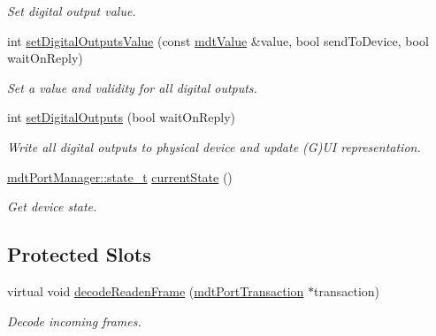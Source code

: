 \begin{DoxyCompactItemize}
\begin{DoxyCompactList}\small\item\em Set digital output value. \end{DoxyCompactList}\item 
int \hyperlink{classmdt_device_aeb4eace4b537b6a9d38942f06acb7e92}{set\-Digital\-Outputs\-Value} (const \hyperlink{classmdt_value}{mdt\-Value} \&value, bool send\-To\-Device, bool wait\-On\-Reply)
\begin{DoxyCompactList}\small\item\em Set a value and validity for all digital outputs. \end{DoxyCompactList}\item 
int \hyperlink{classmdt_device_a7b86a816e55a91f0d62426e1741437c6}{set\-Digital\-Outputs} (bool wait\-On\-Reply)
\begin{DoxyCompactList}\small\item\em Write all digital outputs to physical device and update (G)U\-I representation. \end{DoxyCompactList}\item 
\hyperlink{classmdt_port_manager_a9448339d7f08ca5e18b904df25b382da}{mdt\-Port\-Manager\-::state\-\_\-t} \hyperlink{classmdt_device_a76ddf08ac78502b835b192a8f38f963f}{current\-State} ()
\begin{DoxyCompactList}\small\item\em Get device state. \end{DoxyCompactList}\end{DoxyCompactItemize}
\subsection*{Protected Slots}
\begin{DoxyCompactItemize}
\item 
virtual void \hyperlink{classmdt_device_ad211ba3be781c3db0397d5bf91f796d1}{decode\-Readen\-Frame} (\hyperlink{classmdt_port_transaction}{mdt\-Port\-Transaction} $\ast$transaction)
\begin{DoxyCompactList}\small\item\em Decode incoming frames. \end{DoxyCompactList}\end{DoxyCompactItemize}
